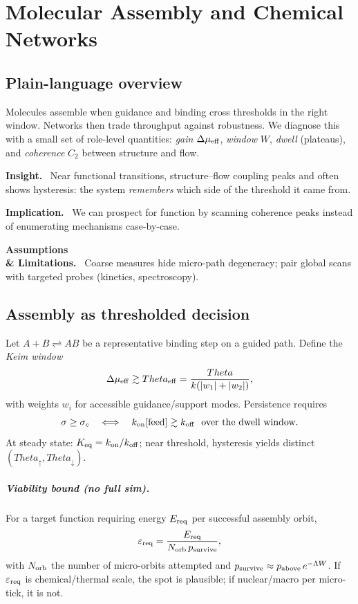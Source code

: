 \documentclass[12pt,a4paper,oneside]{scrreprt}
\def\Theta{Theta}%
\newenvironment{insight}{\par\vspace{0.5em}\noindent\textbf{Insight.}\ }{\par\vspace{0.5em}}
\newenvironment{implication}{\par\vspace{0.5em}\noindent\textbf{Implication.}\ }{\par\vspace{0.5em}}
\newenvironment{limitation}{\par\vspace{0.5em}\noindent\textbf{Assumptions \\ \& Limitations.}\ }{\par\vspace{0.5em}}
\begin{document}
\chapter{Molecular Assembly and Chemical Networks}\label{ch:molecular-networks}

\section*{Plain-language overview}
Molecules assemble when guidance and binding cross thresholds in the right window. Networks then trade throughput against robustness. We diagnose this with a small set of role-level quantities: \emph{gain} $\Delta\mu_{\rm eff}$, \emph{window} $W$, \emph{dwell} (plateaus), and \emph{coherence} $C_2$ between structure and flow.

\begin{insight}
Near functional transitions, structure–flow coupling peaks and often shows hysteresis: the system \emph{remembers} which side of the threshold it came from.
\end{insight}

\begin{implication}
We can prospect for function by scanning coherence peaks instead of enumerating mechanisms case-by-case.
\end{implication}

\begin{limitation}
Coarse measures hide micro-path degeneracy; pair global scans with targeted probes (kinetics, spectroscopy).
\end{limitation}

\section{Assembly as thresholded decision}\label{sec:assembly-threshold}
Let $A+B \rightleftharpoons AB$ be a representative binding step on a guided path.
Define the \emph{Keim window}
\[
\Delta\mu_{\rm eff}\gtrsim \Theta_{\rm eff}=\frac{\Theta}{k(|w_1|+|w_2|)},
\]
with weights $w_i$ for accessible guidance/support modes. Persistence requires
\[
\sigma\ge\sigma_c \quad\Longleftrightarrow\quad k_{\rm on}[\text{feed}] \gtrsim k_{\rm off} \ \ \text{over the dwell window}.
\]
At steady state: $K_{\rm eq}=k_{\rm on}/k_{\rm off}$; near threshold, hysteresis yields distinct $(\Theta_\uparrow,\Theta_\downarrow)$.

\paragraph{Viability bound (no full sim).}
For a target function requiring energy $E_{\rm req}$ per successful assembly orbit,
\[
\varepsilon_{\rm req}=\frac{E_{\rm req}}{N_{\rm orb} \, p_{\rm survive}},
\]
with $N_{\rm orb}$ the number of micro-orbits attempted and $p_{\rm survive}\approx p_{\rm above}\,e^{-\Lambda W}$.
If $\varepsilon_{\rm req}$ is chemical/thermal scale, the spot is plausible; if nuclear/macro per micro-tick, it is not.
\end{document}
